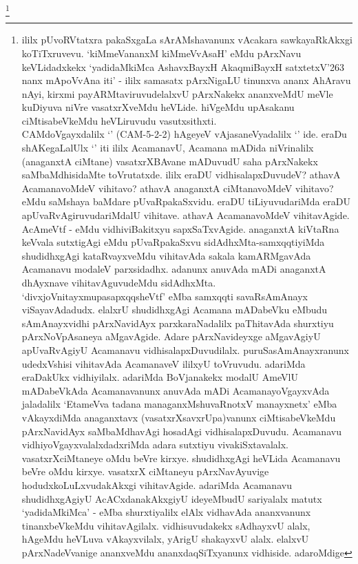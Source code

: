 \begin{artha}
\footnote[1]{ililx pUvoRVtatxra pakaSxgaLa sArAMshavanunx vAcakara 
sawkayaRkAkxgi koTiTxruvevu. `kiMmeVananxM kiMmeVvAsaH' eMdu pArxNavu 
keVLidadxkekx `yadidaMkiMca AshavxBayxH AkaqmiBayxH satxtetxV\char'263 
nanx mApoVvAna iti' - ililx samasatx pArxNigaLU tinunxva ananx AhAravu 
nAyi, kirxmi payARMtaviruvudelalxvU pArxNakekx ananxveMdU meVle 
kuDiyuva niVre vasatxrXveMdu heVLide. hiVgeMdu upAsakanu 
ciMtisabeVkeMdu heVLiruvudu vasutxsithxti.\\
CAMdoVgayxdalilx `\stext' (CAM-5-2-2) hAgeyeV vAjasaneVyadalilx 
`\stext' ide. eraDu shAKegaLalUlx `\stext' iti ililx AcamanavU, 
Acamana mADida niVrinalilx (anaganxtA ciMtane) vasatxrXBAvane mADuvudU 
saha pArxNakekx saMbaMdhisidaMte toVrutatxde. ililx eraDU 
vidhisalapxDuvudeV? athavA AcamanavoMdeV vihitavo? athavA anaganxtA 
ciMtanavoMdeV vihitavo? eMdu saMshaya baMdare pUvaRpakaSxvidu. eraDU 
tiLiyuvudariMda eraDU apUvaRvAgiruvudariMdalU vihitave. athavA 
AcamanavoMdeV vihitavAgide. AcAmeVtf - eMdu vidhiviBakitxyu 
sapxSaTxvAgide. anaganxtA kiVtaRna keVvala sutxtigAgi eMdu 
pUvaRpakaSxvu sidAdhxMta-samxqqtiyiMda shudidhxgAgi kataRvayxveMdu 
vihitavAda sakala kamARMgavAda Acamanavu modaleV parxsidadhx. adanunx 
anuvAda mADi anaganxtA dhAyxnave vihitavAguvudeMdu sidAdhxMta. 
`divxjoVnitayxmupasapxqqsheVtf' eMba samxqqti savaRsAmAnayx 
viSayavAdadudx. elalxrU shudidhxgAgi Acamana mADabeVku eMbudu 
sAmAnayxvidhi pArxNavidAyx parxkaraNadalilx paThitavAda shurxtiyu 
pArxNoVpAsaneya aMgavAgide. Adare pArxNavideyxge aMgavAgiyU 
apUvaRvAgiyU Acamanavu vidhisalapxDuvudilalx. puruSasAmAnayxranunx 
udedxVshisi vihitavAda AcamanaveV ililxyU toVruvudu. adariMda 
eraDakUkx vidhiyilalx. adariMda BoVjanakekx modalU AmeVlU mADabeVkAda 
Acamanavanunx anuvAda mADi AcamanayoVgayxvAda jaladalilx `EtameVva 
tadana managanxMshuvaRnotxV manayxnetx' eMba vAkayxdiMda anaganxtavx 
(vasatxrXsavxrUpa)vanunx ciMtisabeVkeMdu pArxNavidAyx saMbaMdhavAgi 
hosadAgi vidhisalapxDuvudu. Acamanavu vidhiyoVgayxvalalxdadxriMda 
adara sutxtiyu vivakiSxtavalalx. vasatxrXciMtaneye oMdu beVre kirxye. 
shudidhxgAgi heVLida Acamanavu beVre oMdu kirxye. vasatxrX ciMtaneyu 
pArxNavAyuvige hodudxkoLuLxvudakAkxgi vihitavAgide. adariMda Acamanavu 
shudidhxgAgiyU AcACxdanakAkxgiyU ideyeMbudU sariyalalx matutx 
`yadidaMkiMca' - eMba shurxtiyalilx elAlx vidhavAda ananxvanunx 
tinanxbeVkeMdu vihitavAgilalx. vidhisuvudakekx sAdhayxvU alalx, 
hAgeMdu heVLuva vAkayxvilalx, yArigU shakayxvU alalx. elalxvU 
pArxNadeVvanige ananxveMdu ananxdaqSiTxyanunx vidhiside. adaroMdige 
}
\end{artha}
